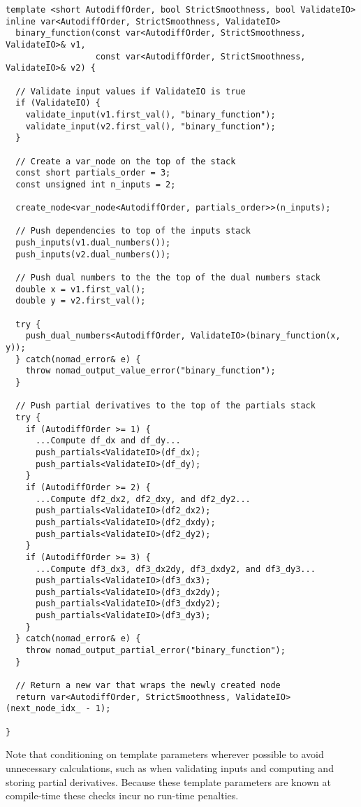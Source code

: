 \begin{verbatim}
template <short AutodiffOrder, bool StrictSmoothness, bool ValidateIO>
inline var<AutodiffOrder, StrictSmoothness, ValidateIO>
  binary_function(const var<AutodiffOrder, StrictSmoothness, ValidateIO>& v1,
                  const var<AutodiffOrder, StrictSmoothness, ValidateIO>& v2) {
    
  // Validate input values if ValidateIO is true
  if (ValidateIO) {
    validate_input(v1.first_val(), "binary_function");
    validate_input(v2.first_val(), "binary_function");
  }
      
  // Create a var_node on the top of the stack
  const short partials_order = 3;
  const unsigned int n_inputs = 2;
    
  create_node<var_node<AutodiffOrder, partials_order>>(n_inputs);

  // Push dependencies to top of the inputs stack
  push_inputs(v1.dual_numbers());
  push_inputs(v2.dual_numbers());

  // Push dual numbers to the the top of the dual numbers stack
  double x = v1.first_val();
  double y = v2.first_val();
    
  try {
    push_dual_numbers<AutodiffOrder, ValidateIO>(binary_function(x, y));
  } catch(nomad_error& e) {
    throw nomad_output_value_error("binary_function");
  }
    
  // Push partial derivatives to the top of the partials stack
  try {
    if (AutodiffOrder >= 1) {
      ...Compute df_dx and df_dy...
      push_partials<ValidateIO>(df_dx);
      push_partials<ValidateIO>(df_dy);
    }
    if (AutodiffOrder >= 2) {
      ...Compute df2_dx2, df2_dxy, and df2_dy2...
      push_partials<ValidateIO>(df2_dx2);
      push_partials<ValidateIO>(df2_dxdy);
      push_partials<ValidateIO>(df2_dy2);
    }
    if (AutodiffOrder >= 3) {
      ...Compute df3_dx3, df3_dx2dy, df3_dxdy2, and df3_dy3...
      push_partials<ValidateIO>(df3_dx3);
      push_partials<ValidateIO>(df3_dx2dy);
      push_partials<ValidateIO>(df3_dxdy2);
      push_partials<ValidateIO>(df3_dy3);
    }
  } catch(nomad_error& e) {
    throw nomad_output_partial_error("binary_function");
  }

  // Return a new var that wraps the newly created node
  return var<AutodiffOrder, StrictSmoothness, ValidateIO>(next_node_idx_ - 1);
    
}
\end{verbatim}
%
Note that conditioning on template parameters wherever possible to avoid
unnecessary calculations, such as when validating inputs and computing
and storing partial derivatives.  Because these template parameters are
known at compile-time these checks incur no run-time penalties.

